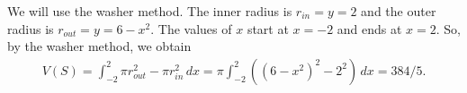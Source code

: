 	We will use the washer method. The inner radius is $r_{in} = y = 2$ and the outer radius is $r_{out} = y = 6 - x^2$. The values of $x$ start at $x = -2$ and ends at $x = 2$. So, by the washer method, we obtain
		\begin{align*}
		V (S) = \int_{-2}^2 \pi r_{out}^2 - \pi r_{in}^2 \, dx = \pi \int_{-2}^2 ((6 - x^2)^2 - 2^2 ) \, dx = 384/5 .
		\end{align*}
	
